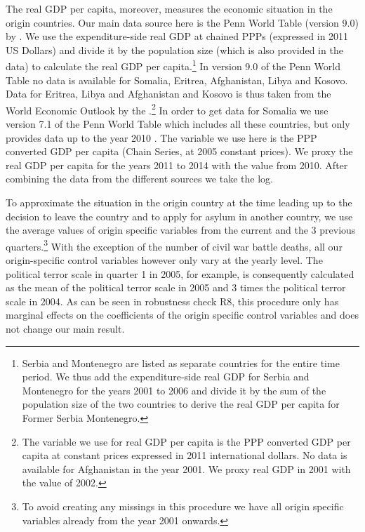\documentclass[11pt,a4paper]{scrartcl}
\begin{document}
The real GDP per capita, moreover, measures the economic situation in the origin countries. Our main data source here is the Penn World Table (version 9.0) by \textcite{PWT2015}. We use the expenditure-side real GDP at chained PPPs (expressed in 2011 US Dollars) and divide it by the population size (which is also provided in the data) to calculate the real GDP per capita.\footnote{Serbia and Montenegro are listed as separate countries for the entire time period. We thus add the expenditure-side real GDP for Serbia and Montenegro for the years 2001 to 2006 and divide it by the sum of the population size of the two countries to derive the real GDP per capita for Former Serbia Montenegro.} In version 9.0 of the Penn World Table no data is available for Somalia, Eritrea, Afghanistan, Libya and Kosovo. Data for Eritrea, Libya and Afghanistan and Kosovo is thus taken from the World Economic Outlook by the \textcite{IMF2017}.\footnote{The variable we use for real GDP per capita is the PPP converted GDP per capita at constant prices expressed in 2011 international dollars. No data is available for Afghanistan in the year 2001. We proxy real GDP in 2001 with the value of 2002.} In order to get data for Somalia we use version 7.1 of the Penn World Table which includes all these countries, but only provides data up to the year 2010 \parencite{PWT2012}. The variable we use here is the PPP converted GDP per capita (Chain Series, at 2005 constant prices). We proxy the real GDP per capita for the years 2011 to 2014 with the value from 2010. After combining the data from the different sources we take the log. 

To approximate the situation in the origin country at the time leading up to the decision to leave the country and to apply for asylum in another country, we use the average values of origin specific variables from the current and the 3 previous quarters.\footnote{To avoid creating any missings in this procedure we have all origin specific variables already from the year 2001 onwards.} With the exception of the number of civil war battle deaths, all our origin-specific control variables however only vary at the yearly level. The political terror scale in quarter 1 in 2005, for example, is consequently calculated as the mean of the political terror scale in 2005 and 3 times the political terror scale in 2004. As can be seen in robustness check R8, this procedure only has marginal effects on the coefficients of the origin specific control variables and does not change our main result. 
\end{document}
